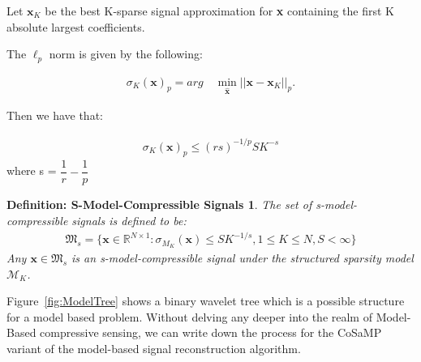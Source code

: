 \documentclass[titlepage,oneside, 12pt]{book}
\theoremstyle{break}
\begin{document}
Let $\textbf{x}_{K}$ be the best K-sparse signal approximation for \textbf{x} containing the first K absolute largest coefficients.
 
The $\ell_{p}$ norm is given by the following:

\begin{equation}
\begin{gathered}
\sigma_{K}(\textbf{x})_{p} = arg\quad \underset{\hat{\textbf{x}}} \min ||\textbf{x} - \textbf{x}_{K}||_{p}.
\end{gathered}
\end{equation}


Then we have that:

\begin{equation}
\begin{gathered}
\sigma_{K}(\textbf{x})_{p} \leq (rs)^{-1/p}SK^{-s}
\end{gathered}
\label{eqn:pnormpower2}
\end{equation}
where s = $\dfrac{1}{r} - \dfrac{1}{p}$




\newtheorem*{SCS}{Definition: S-Model-Compressible Signals}
\begin{SCS}
The set of s-model-compressible signals is defined to be: 
\begin{equation}
\begin{gathered}
\mathfrak{M}_s = \{\textbf{x} \in \mathbb{R}^{N \times 1}: \sigma_{M_{K}}(\textbf{x}) \leq SK^{-1/s}, 1\leq K \leq N, S < \infty\}
\end{gathered}
\label{eqn:MFrac}
\end{equation}
Any $\textbf{x} \in \mathfrak{M}_{s}$ is an s-model-compressible signal under the structured sparsity model $\mathcal{M}_{K}$. 
\end{SCS}

Figure~\ref{fig:ModelTree} shows a binary wavelet tree which is a possible structure for a model based problem. 
Without delving any deeper into the realm of Model-Based compressive sensing, we can write down the process for the CoSaMP variant of the model-based signal reconstruction algorithm.
 
\end{document}
